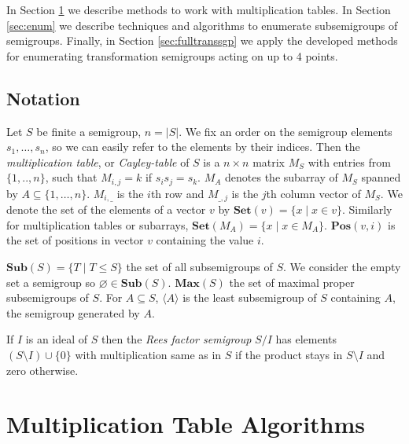 \documentclass{amsart}
\newcommand{\Sub}{\mathbf{Sub}}
\newcommand{\Set}{\mathbf{Set}}
\newcommand{\Pos}{\mathbf{Pos}}
\newcommand{\Max}{\mathbf{Max}}
\theoremstyle{plain}
\theoremstyle{definition}
\begin{document}
In Section \ref{sec:multab} we describe methods to work with multiplication tables.
In Section \ref{sec:enum} we describe techniques and algorithms to enumerate subsemigroups of semigroups.
Finally, in Section \ref{sec:fulltranssgp} we apply the developed methods for enumerating transformation semigroups acting on up to 4 points.

\subsection{Notation}

Let $S$ be finite a semigroup, $n=|S|$.
We fix an order on the semigroup elements $s_1,\ldots, s_n$, so we can easily refer to the elements by their indices. 
Then the  \emph{multiplication table}, or \emph{Cayley-table} of $S$ is a $n\times n$ matrix $M_S$ with entries from $\{1,..,n\}$, such that $M_{i,j}=k$ if $s_is_j=s_k$.
$M_A$ denotes the subarray of $M_S$ spanned by $A\subseteq\{1,\ldots,n\}$.
$M_{i,\_}$ is the $i$th row and $M_{\_,j}$ is the $j$th column vector of $M_S$.
We denote the set of the elements of a vector $v$ by $\Set(v)=\{x\mid x\in v\}$.
Similarly for multiplication tables or subarrays, $\Set(M_A)=\{x\mid x\in M_A\}$.
$\Pos(v,i)$ is the set of positions in vector $v$ containing the value $i$.

$\Sub(S)=\big\{T\mid T\leq S \big\}$ the set of all subsemigroups of $S$.
We consider the empty set a semigroup so $\varnothing\in\Sub(S)$.
$\Max(S)$ the set of maximal proper subsemigroups of $S$.
For $A\subseteq S$, $\langle A\rangle$ is the least subsemigroup of $S$ containing $A$, the semigroup generated by $A$. 

If $I$ is an ideal of $S$ then the \emph{Rees factor semigroup} $S/I$ has elements $(S\setminus I)\cup\{0\}$ with multiplication same as in $S$ if the product stays in $S\setminus I$ and zero otherwise.
\section{Multiplication Table Algorithms}
\label{sec:multab}
\end{document}
